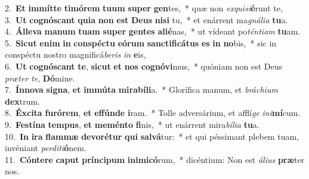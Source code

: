{2.~}\textbf{Et} \textbf{im}\textbf{mít}\textbf{te} \textbf{ti}\textbf{mó}\textbf{rem} \textbf{tu}\textbf{um} \textbf{su}\textbf{per} \textbf{gen}tes,~* quæ non \textit{ex}\textit{qui}\textit{si}\textbf{é}runt te,\\
{3.~}\textbf{Ut} \textbf{co}\textbf{gnó}\textbf{scant} \textbf{qui}\textbf{a} \textbf{non} \textbf{est} \textbf{De}\textbf{us} \textbf{ni}\textbf{si} tu,~* et enárrent ma\textit{gná}\textit{li}\textit{a} \textbf{tu}a.\\
{4.~}\textbf{Ál}\textbf{le}\textbf{va} \textbf{ma}\textbf{num} \textbf{tu}\textbf{am} \textbf{su}\textbf{per} \textbf{gen}\textbf{tes} \textbf{a}\textbf{li}\textbf{é}nas,~* ut vídeant po\textit{tén}\textit{ti}\textit{am} \textbf{tu}am.\\
{5.~}\textbf{Si}\textbf{cut} \textbf{e}\textbf{nim} \textbf{in} \textbf{con}\textbf{spé}\textbf{ctu} \textbf{e}\textbf{ó}\textbf{rum} \textbf{san}\textbf{cti}\textbf{fi}\textbf{cá}\textbf{tus} \textbf{es} \textbf{in} \textbf{no}bis,~* sic in conspéctu nostro magnificá\textit{be}\textit{ris} \textit{in} \textbf{e}is,\\
{6.~}\textbf{Ut} \textbf{co}\textbf{gnó}\textbf{scant} \textbf{te}, \textbf{si}\textbf{cut} \textbf{et} \textbf{nos} \textbf{co}\textbf{gnó}\textbf{vi}mus,~* quóniam non est Deus \textit{præ}\textit{ter} \textit{te}, \textbf{Dó}mine.\\
{7.~}\textbf{Ín}\textbf{no}\textbf{va} \textbf{si}\textbf{gna}, \textbf{et} \textbf{im}\textbf{mú}\textbf{ta} \textbf{mi}\textbf{ra}\textbf{bí}\textbf{li}a.~* Glorífica manum, et \textit{brá}\textit{chi}\textit{um} \textbf{dex}trum.\\
{8.~}\textbf{Éx}\textbf{ci}\textbf{ta} \textbf{fu}\textbf{ró}\textbf{rem}, \textbf{et} \textbf{ef}\textbf{fún}\textbf{de} \textbf{i}ram.~* Tolle adversárium, et afflí\textit{ge} \textit{i}\textit{ni}\textbf{mí}cum.\\
{9.~}\textbf{Fe}\textbf{stí}\textbf{na} \textbf{tem}\textbf{pus}, \textbf{et} \textbf{me}\textbf{mén}\textbf{to} \textbf{fi}nis,~* ut enárrent mira\textit{bí}\textit{li}\textit{a} \textbf{tu}a.\\
{10.~}\textbf{In} \textbf{i}\textbf{ra} \textbf{flam}\textbf{mæ} \textbf{de}\textbf{vo}\textbf{ré}\textbf{tur} \textbf{qui} \textbf{sal}\textbf{vá}tur:~* et qui péssimant plebem tuam, invéniant \textit{per}\textit{di}\textit{ti}\textbf{ó}nem.\\
{11.~}\textbf{Cón}\textbf{te}\textbf{re} \textbf{ca}\textbf{put} \textbf{prín}\textbf{ci}\textbf{pum} \textbf{i}\textbf{ni}\textbf{mi}\textbf{có}rum,~* dicéntium: Non est \textit{á}\textit{li}\textit{us} \textbf{præ}ter nos.\\
